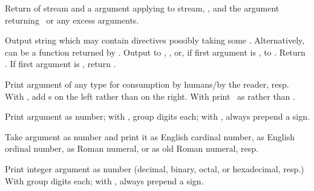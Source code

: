 \begin{LIST}{1cm}

  Return  of stream and a  argument applying  to
  stream, , and the  argument
  returning \NIL\ or any excess arguments. 

  Output string  which may
  contain \kwd{\TLD} directives possibly taking some
  . Alternatively,  can be a function returned
  by .
  Output to , , or, if first
  argument is \T, to . Return \retval{\NIL}. If
  first argument is \NIL, return . 

  \begin{LIST}{.5cm}

    Print argument of any type for consumption by humans/by the
    reader, resp. With , add s on the left
    rather than on the right. With \kwd{:} print \NIL\ as \LIT{()} rather
    than .

    Print argument as number; with \KWD{:}, group digits 
     each; with , always prepend a sign.

    Take argument as number and print it as English cardinal number,
    as English ordinal number, as Roman numeral, or as old Roman
    numeral, resp.

    Print integer argument as number (decimal, binary, octal, or
    hexadecimal, resp.) With \kwd{:} group digits 
     each; with , always prepend a sign.


\end{LIST}
\end{LIST}
